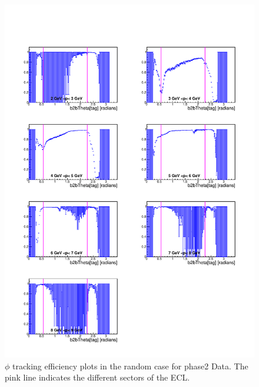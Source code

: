 \documentclass[a4paper,11pt,twosided,final,german,openbib,pdftex,listof=totoc,bibliography=totoc]{scrbook}
\begin{document}
\begin{appendix}
\begin{figure}[!htbp]
	\centering
	\includegraphics[width=\textwidth]{Plots/master/xPMThetaRandom_Data}
	\caption[Momentum $\theta$ Random Efficiency Phase2 Data]{$\phi$ tracking efficiency plots in the random case for phase2 Data. The pink line indicates the different sectors of the ECL.}
	\label{plt:PMThetaRandom_Data}
\end{figure}



\end{appendix}
\end{document}

